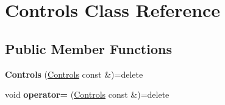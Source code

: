 \hypertarget{classControls}{\section{Controls Class Reference}
\label{classControls}
}
\subsection*{Public Member Functions}
\begin{DoxyCompactItemize}
\item 
\hypertarget{classControls_a43d7b0b129db7f8a4ad812a80a38e588}{{\bfseries Controls} (\hyperlink{classControls}{Controls} const \&)=delete}\label{classControls_a43d7b0b129db7f8a4ad812a80a38e588}

\item 
\hypertarget{classControls_aed39c82394c9caa2ca5ea08906249e46}{void {\bfseries operator=} (\hyperlink{classControls}{Controls} const \&)=delete}\label{classControls_aed39c82394c9caa2ca5ea08906249e46}

\end{DoxyCompactItemize}
